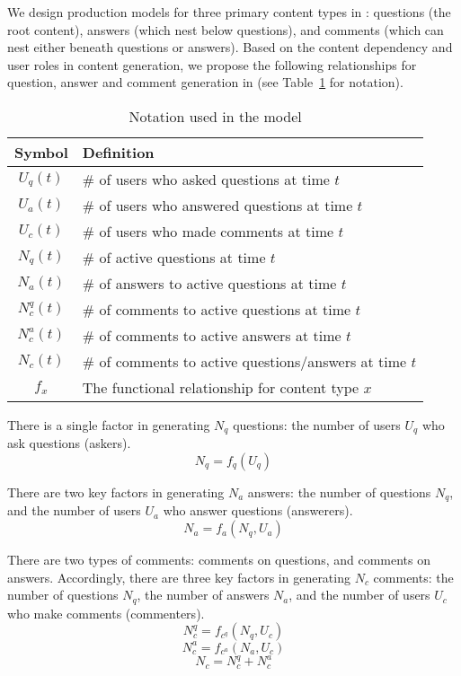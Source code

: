 We design production models for three primary content types in : questions (the root content), answers (which nest below questions), and comments (which can nest either beneath questions or answers). Based on the content dependency and user roles in content generation, we propose the following relationships for question, answer and comment generation in  (see Table~\ref{tab:notations} for notation).

\begin{table}[thb]
	\caption{Notation used in the model}
    \label{tab:notations}
	\begin{center}    
	\begin{tabular}{cl}
	\toprule Symbol & Definition\\ \midrule
	$U_q(t)$ & \# of users who asked questions at time $t$\\ 
	$U_a(t)$ & \# of users who answered questions at time $t$\\
	$U_c(t)$ & \# of users who made comments at time $t$\\
	$N_q(t)$ & \# of active questions at time $t$\\
	$N_a(t)$ & \# of answers to active questions at time $t$\\
	$N_c^q(t)$ & \# of comments to active questions at time $t$\\
	$N_c^a(t)$ & \# of comments to active answers at time $t$\\
    $N_c(t)$ & \# of comments to active questions/answers at time $t$\\
	$f_x$ & The functional relationship for content type $x$\\ \bottomrule
	\end{tabular}
    \end{center}
\end{table}

There is a single factor in generating $N_q$ questions: the number of users $U_q$ who ask questions (askers).
\begin{equation*}
N_q = f_q(U_q)
\end{equation*}

There are two key factors in generating $N_a$ answers: the number of questions $N_q$, and the number of users $U_a$ who answer questions (answerers). 
\begin{equation*}
N_a = f_a(N_q, U_a)
\end{equation*}

There are two types of comments: comments on questions, and comments on answers. Accordingly, there are three key factors in generating $N_c$ comments: the number of questions $N_q$, the number of answers $N_a$, and the number of users $U_c$ who make comments (commenters). 
\begin{equation*}
N_c^q = f_{c^q}(N_q, U_c)
\end{equation*}
\begin{equation*}
N_c^a = f_{c^a}(N_a, U_c)
\end{equation*}
\begin{equation*}
N_c = N_c^q + N_c^a
\end{equation*}

